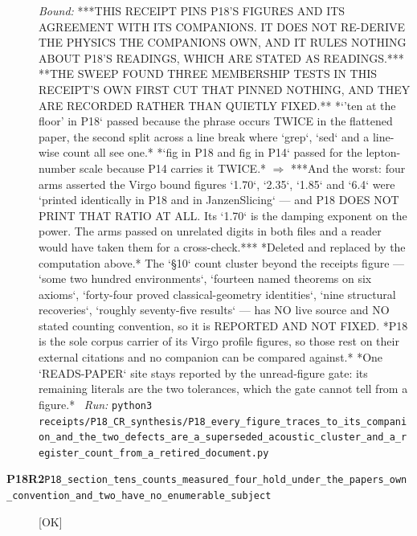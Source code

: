 \begin{description}
 \emph{Bound:}  ***THIS RECEIPT PINS P18'S FIGURES AND ITS AGREEMENT WITH ITS COMPANIONS. IT DOES NOT RE-DERIVE THE PHYSICS THE COMPANIONS OWN, AND IT RULES NOTHING ABOUT P18'S READINGS, WHICH ARE STATED AS READINGS.***  **THE SWEEP FOUND THREE MEMBERSHIP TESTS IN THIS RECEIPT'S OWN FIRST CUT THAT PINNED NOTHING, AND THEY ARE RECORDED RATHER THAN QUIETLY FIXED.** *`'ten at the floor' in P18` passed because the phrase occurs TWICE in the flattened paper, the second split across a line break where `grep`, `sed` and a line-wise count all see one.* *`fig in P18 and fig in P14` passed for the lepton-number scale because P14 carries it TWICE.* \ensuremath{\Rightarrow} ***And the worst: four arms asserted the Virgo bound figures `1.70`, `2.35`, `1.85` and `6.4` were `printed identically in P18 and in JanzenSlicing` --- and P18 DOES NOT PRINT THAT RATIO AT ALL. Its `1.70` is the damping exponent on the power. The arms passed on unrelated digits in both files and a reader would have taken them for a cross-check.*** *Deleted and replaced by the computation above.*  The `\S{}10` count cluster beyond the receipts figure --- `some two hundred environments`, `fourteen named theorems on six axioms`, `forty-four proved classical-geometry identities`, `nine structural recoveries`, `roughly seventy-five results` --- has NO live source and NO stated counting convention, so it is REPORTED AND NOT FIXED.  *P18 is the sole corpus carrier of its Virgo profile figures, so those rest on their external citations and no companion can be compared against.*  *One `READS-PAPER` site stays reported by the unread-figure gate: its remaining literals are the two tolerances, which the gate cannot tell from a figure.*
\ \emph{Run:} \texttt{python3 receipts/P18\_CR\_synthesis/P18\_every\_figure\_traces\_to\_its\_companion\_and\_the\_two\_defects\_are\_a\_superseded\_acoustic\_cluster\_and\_a\_register\_count\_from\_a\_retired\_document.py}
\item[\rcptlabel{P18_section_tens_counts_measured_four_hold_under_the_papers_own_convention_and_two_have_no_enumerable_subject}{P18R2}\textbf{P18R2}\quad\texttt{P18\_section\_tens\_counts\_measured\_four\_hold\_under\_the\_papers\_own\_convention\_and\_two\_have\_no\_enumerable\_subject}]\hfill\textsf{[OK]}\\

\end{description}
